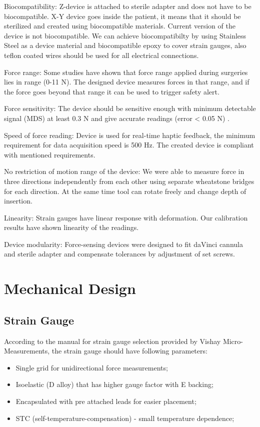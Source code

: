 	Biocompatibility: Z-device is attached to sterile adapter and does not have to be biocompatible. X-Y device goes inside the patient, it means that it should be sterilized and created using biocompatible materials. Current version of the device is not biocompatible. We can achieve biocompatibilty by using Stainless Steel as a device material and biocompatible epoxy to cover strain gauges, also teflon coated wires should be used for all electrical connections.
	
	Force range: Some studies \cite{mack_interactive_2012, prasad_modular_2003, } have shown that force range applied during surgeries lies in range (0-11 N). The designed device measures forces in that range, and if the force goes beyond that range it can be used to trigger safety alert.
	
	Force sensitivity: The device should be sensitive enough with minimum detectable signal (MDS) at least 0.3 N and give accurate readings (error < 0.05 N) \cite{mack_interactive_2012}.
	
	Speed of force reading: Device is used for real-time haptic feedback, the minimum requirement for data acquisition speed is 500 Hz. The created device is compliant with mentioned requirements.
	
	No restriction of motion range of the device: We were able to measure force in three directions independently from each other using separate wheatstone bridges for each direction. At the same time tool can rotate freely and change depth of insertion.	
	
	Linearity: Strain gauges have linear response with deformation. Our calibration results have shown linearity of the readings.

	Device modularity: Force-sensing devices were designed to fit daVinci cannula and sterile adapter and compensate tolerances by adjustment of set screws.
	
\section{Mechanical Design}
\label{sec:mechDes}

	\subsection{Strain Gauge}
	\label{sec:SGReq}
	According to the manual for strain gauge selection provided by Vishay Micro-Measurements, the strain gauge should have following parameters:
\begin{itemize}
  \item Single grid for unidirectional force measurements;
  \item Isoelastic (D alloy) that has higher gauge factor with E backing;
  \item Encapsulated with pre attached leads for easier placement;
  \item STC (self-temperature-compensation) - small temperature dependence;
\end{itemize}	
	
